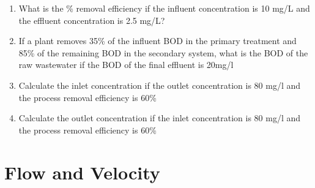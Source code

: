 \begin{enumerate}

\item What is the \% removal efficiency if the influent concentration is 10 mg/L and the effluent concentration is 2.5 mg/L?\\
\item If a plant removes 35\% of the influent BOD in the primary treatment and 85\% of the remaining BOD in the secondary system, what is the BOD of the raw wastewater if the BOD of the final effluent is 20mg/l \\
\item Calculate the inlet concentration if the outlet concentration is 80 mg/l and the process removal efficiency is 60\%\\
\item Calculate the outlet concentration if the inlet concentration is 80 mg/l and the process removal efficiency is 60\%\\
\end{enumerate}

\newpage
\section{Flow and Velocity}
